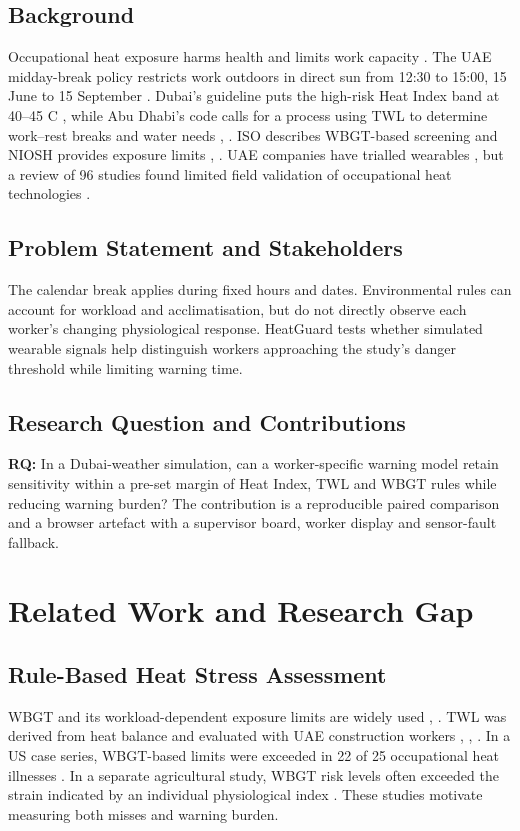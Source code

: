 \documentclass[conference,a4paper]{IEEEtran}
\begin{document}
\subsection{Background}
Occupational heat exposure harms health and limits work capacity \cite{kjellstrom}. The UAE midday-break policy restricts work outdoors in direct sun from 12:30 to 15:00, 15 June to 15 September \cite{mohre}. Dubai's guideline puts the high-risk Heat Index band at 40--45 \textdegree C \cite{dm}, while Abu Dhabi's code calls for a process using TWL to determine work--rest breaks and water needs \cite{oshad}, \cite{brake}. ISO describes WBGT-based screening and NIOSH provides exposure limits \cite{iso7243}, \cite{niosh}. UAE companies have trialled wearables \cite{ega}, but a review of 96 studies found limited field validation of occupational heat technologies \cite{asto}.

\subsection{Problem Statement and Stakeholders}
The calendar break applies during fixed hours and dates. Environmental rules can account for workload and acclimatisation, but do not directly observe each worker's changing physiological response. HeatGuard tests whether simulated wearable signals help distinguish workers approaching the study's danger threshold while limiting warning time.

\subsection{Research Question and Contributions}
\textbf{RQ:} In a Dubai-weather simulation, can a worker-specific warning model retain sensitivity within a pre-set margin of Heat Index, TWL and WBGT rules while reducing warning burden? The contribution is a reproducible paired comparison and a browser artefact with a supervisor board, worker display and sensor-fault fallback.

\section{Related Work and Research Gap}

\subsection{Rule-Based Heat Stress Assessment}
WBGT and its workload-dependent exposure limits are widely used \cite{iso7243}, \cite{niosh}. TWL was derived from heat balance and evaluated with UAE construction workers \cite{brake}, \cite{millerbates}, \cite{bates}. In a US case series, WBGT-based limits were exceeded in 22 of 25 occupational heat illnesses \cite{tustin}. In a separate agricultural study, WBGT risk levels often exceeded the strain indicated by an individual physiological index \cite{sousan}. These studies motivate measuring both misses and warning burden.
\end{document}
